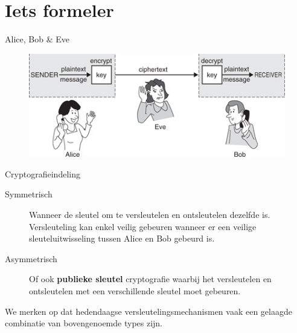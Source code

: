 \documentclass{beamer}
\begin{document}

\section{Iets formeler}


\begin{frame}{Alice, Bob \& Eve}
	\begin{figure}
		\includegraphics[width=\textwidth]{img/adameve.jpg}
	\end{figure}
\end{frame}

\begin{frame}{Cryptografieindeling}
	\begin{description}
		\item[Symmetrisch] Wanneer de sleutel om te versleutelen en ontsleutelen dezelfde is. Versleuteling kan enkel veilig gebeuren wanneer er een veilige sleuteluitwisseling tussen Alice en Bob gebeurd is.
	\item[Asymmetrisch] Of ook \textbf{publieke sleutel} cryptografie waarbij het versleutelen en ontsleutelen met een verschillende sleutel moet
	gebeuren.
\end{description}
We merken op dat hedendaagse versleutelingsmechanismen vaak een gelaagde combinatie van bovengenoemde types zijn.
\end{frame}
\end{document}
